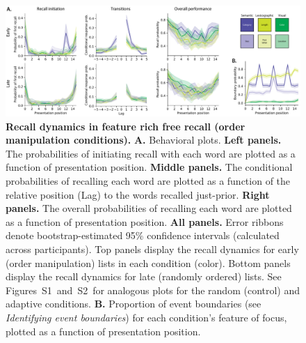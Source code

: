 \documentclass[11pt]{article}
\newcommand{\dynamicsRandom}{S1}
\newcommand{\dynamicsAdaptive}{S2}
\begin{document}
\begin{figure}[tp] \centering
\includegraphics[width=\textwidth]{figures/recall_dynamics}

\caption{\textbf{Recall dynamics in feature rich free recall (order
manipulation conditions).} \textbf{A.} Behavioral plots. \textbf{Left panels.}
The probabilities of initiating recall with each word are plotted as a function
of presentation position. \textbf{Middle panels.} The conditional probabilities
of recalling each word are plotted as a function of the relative position (Lag)
to the words recalled just-prior. \textbf{Right panels.} The overall
probabilities of recalling each word are plotted as a function of presentation
position. \textbf{All panels.} Error ribbons denote bootstrap-estimated 95\%
confidence intervals (calculated across participants). Top panels display the
recall dynamics for early (order manipulation) lists in each condition (color).
Bottom panels display the recall dynamics for late (randomly ordered) lists.
See Figures~\dynamicsRandom~and~\dynamicsAdaptive~for analogous plots for the
random (control) and adaptive conditions. \textbf{B.} Proportion of event
boundaries (see \textit{Identifying event boundaries}) for each condition's
feature of focus, plotted as a function of presentation position.}

    \label{fig:recall-dynamics}
\end{figure}
\end{document}
